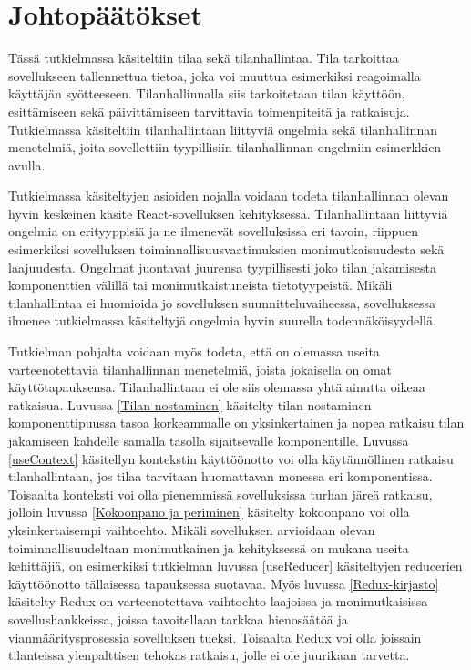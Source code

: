 \chapter{Johtopäätökset} \label{Johtopäätökset}


Tässä tutkielmassa käsiteltiin tilaa sekä tilanhallintaa. Tila tarkoittaa sovellukseen tallennettua tietoa, joka voi muuttua esimerkiksi reagoimalla käyttäjän syötteeseen. Tilanhallinnalla siis tarkoitetaan tilan käyttöön, esittämiseen sekä päivittämiseen tarvittavia toimenpiteitä ja ratkaisuja. Tutkielmassa käsiteltiin tilanhallintaan liittyviä ongelmia sekä tilanhallinnan menetelmiä, joita sovellettiin tyypillisiin tilanhallinnan ongelmiin esimerkkien avulla.

Tutkielmassa käsiteltyjen asioiden nojalla voidaan todeta tilanhallinnan olevan hyvin keskeinen käsite React-sovelluksen kehityksessä. Tilanhallintaan liittyviä ongelmia on erityyppisiä ja ne ilmenevät sovelluksissa eri tavoin, riippuen esimerkiksi sovelluksen toiminnallisuusvaatimuksien monimutkaisuudesta sekä laajuudesta. Ongelmat juontavat juurensa tyypillisesti joko tilan jakamisesta komponenttien välillä tai monimutkaistuneista tietotyypeistä. Mikäli tilanhallintaa ei huomioida jo sovelluksen suunnitteluvaiheessa, sovelluksessa ilmenee tutkielmassa käsiteltyjä ongelmia hyvin suurella todennäköisyydellä. 

Tutkielman pohjalta voidaan myös todeta, että on olemassa useita varteenotettavia tilanhallinnan menetelmiä, joista jokaisella on omat käyttötapauksensa. Tilanhallintaan ei ole siis olemassa yhtä ainutta oikeaa ratkaisua. Luvussa \ref{Tilan nostaminen} käsitelty tilan nostaminen komponenttipuussa tasoa korkeammalle on yksinkertainen ja nopea ratkaisu tilan jakamiseen kahdelle samalla tasolla sijaitsevalle komponentille. Luvussa \ref{useContext} käsitellyn kontekstin käyttöönotto voi olla käytännöllinen ratkaisu tilanhallintaan, jos tilaa tarvitaan huomattavan monessa eri komponentissa. Toisaalta konteksti voi olla pienemmissä sovelluksissa turhan järeä ratkaisu, jolloin luvussa \ref{Kokoonpano ja periminen} käsitelty kokoonpano voi olla yksinkertaisempi vaihtoehto. Mikäli sovelluksen arvioidaan olevan toiminnallisuudeltaan monimutkainen ja kehityksessä on mukana useita kehittäjiä, on esimerkiksi tutkielman luvussa \ref{useReducer} käsiteltyjen reducerien käyttöönotto tällaisessa tapauksessa suotavaa. Myös luvussa \ref{Redux-kirjasto} käsitelty Redux on varteenotettava vaihtoehto laajoissa ja monimutkaisissa sovellushankkeissa, joissa tavoitellaan tarkkaa hienosäätöä ja vianmääritysprosessia sovelluksen tueksi. Toisaalta Redux voi olla joissain tilanteissa ylenpalttisen tehokas ratkaisu, jolle ei ole juurikaan tarvetta.

